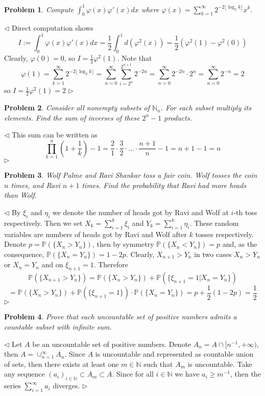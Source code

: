 \documentclass[12pt]{article}
\newtheorem{problem}{Problem}[subsection]
\newenvironment{solution}{\par $\triangleleft$}{$\triangleright$}
\begin{document}
\begin{problem} Compute $\int_0^1 \varphi(x)\varphi'(x)dx$ where $\varphi(x)=\sum_{k=1}^\infty2^{-2\lfloor \log_2k\rfloor} x^k$.
\end{problem}
\begin{solution} Direct computation shows
$$
I:=\int_0^1 \varphi(x)\varphi'(x)dx
=\frac{1}{2}\int_0^1 d(\varphi^2(x))
=\frac{1}{2}(\varphi^2(1)-\varphi^2(0))
$$
Clearly, $\varphi(0)=0$, so $I=\frac{1}{2}\varphi^2(1)$. Note that
$$
\varphi(1)
=\sum_{k=1}^\infty2^{-2\lfloor \log_2k\rfloor}
=\sum_{n=0}^\infty\sum_{i=2^n}^{2^{n+1}} 2^{-2n}
=\sum_{n=0}^\infty 2^{-2n}\cdot 2^n
=\sum_{n=0}^\infty 2^{-n}
=2
$$
so $I=\frac{1}{2}\varphi^2(1)=2$
\end{solution}
 
\begin{problem} Consider all nonempty subsets of $\mathbb{N}_n$. For each subset multiply its elements. Find the sum of inverses of these $2^n-1$ products.
\end{problem}
\begin{solution} This sum can be written as
$$
\prod_{k=1}^n\left(1+\frac{1}{k}\right)-1=\frac{2}{1}\cdot\frac{3}{2}\cdot\ldots\cdot\frac{n+1}{n}-1=n+1-1=n
$$
\end{solution}
 
\begin{problem} Wolf Palme and Ravi Shankar toss a fair coin. Wolf tosses the coin $n$ times, and Ravi $n+1$ times. Find the probability that Ravi had more heads than Wolf. 
\end{problem}
\begin{solution} By $\xi_i$ and $\eta_i$ we denote the number of heads got by Ravi and Wolf at $i$-th toss respectively. Then we set $X_k=\sum_{i=1}^k \xi_i$ and $Y_k=\sum_{i=1}^k \eta_i$. These random variables are numbers of heads got by Ravi and Wolf after $k$  tosses respectively. Denote $p=\mathbb{P}(\{X_n>Y_n\})$, then by symmetry $\mathbb{P}(\{X_n<Y_n\})=p$ and, as the consequence, $\mathbb{P}(\{X_n=Y_n\})=1-2p$. Clearly, $X_{n+1}>Y_n$ in two cases $X_n>Y_n$ or $X_n=Y_n$ and on $\xi_{n+1}=1$. Therefore
$$
\mathbb{P}(\{X_{n+1}>Y_n\})
=\mathbb{P}(\{X_n>Y_n\})+\mathbb{P}(\{\xi_{n+1}=1|X_n=Y_n\})
$$
$$
=\mathbb{P}(\{X_n>Y_n\})+\mathbb{P}(\{\xi_{n+1}=1\})\cdot\mathbb{P}(\{X_n=Y_n\})
=p+\frac{1}{2}(1-2p)=\frac{1}{2}
$$
\end{solution}
 
\begin{problem} Prove that each uncountable set of positive numbers admits a countable subset with infinite sum.
\end{problem}
\begin{solution} Let $A$ be an uncountable set of positive numbers. Denote $A_n=A\cap [n^{-1},+\infty)$, then $A=\cup_{n=1}^\infty A_n$. Since $A$ is uncountable and represented as countable  union of sets, then there exists at least one $m\in\mathbb{N}$ such that $A_m$ is uncountable. Take any sequence $(a_i)_{i\in\mathbb{N}}\subset A_m\subset A$. Since for all $i\in\mathbb{N}$ we have $a_i\geq m^{-1}$, then the series $\sum_{i=1}^\infty a_i$ diverges.
\end{solution}
 
\end{document}
